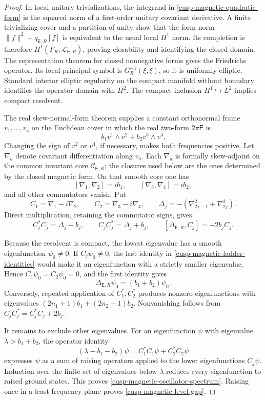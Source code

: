 \begin{proof}
In local unitary trivializations, the integrand in
\eqref{cusp-magnetic-quadratic-form} is the squared norm of a first-order
unitary covariant derivative.  A finite trivializing cover and a partition
of unity show that the form norm
\(\lVert f\rVert^2+q_{\mathsf E,R}[f]\) is equivalent to the usual local \(H^1\)
norm.  Its completion is therefore
\(H^1(F_R;\mathscr L_{\mathsf E,R})\), proving closability and identifying
the closed domain.  The representation theorem for closed nonnegative
forms gives the Friedrichs operator.  Its local principal symbol is
\(G_R^{-1}(\xi,\xi)\), so it is uniformly elliptic.  Standard interior
elliptic regularity on the compact manifold without boundary identifies
the operator domain with \(H^2\).  The compact inclusion
\(H^1\hookrightarrow L^2\) implies compact resolvent.

The real skew-normal-form theorem supplies a constant orthonormal frame
\(v_1,\ldots,v_4\) on the Euclidean cover in which the real two-form
\(2\pi\mathsf E\) is
\[
 b_1v^1\wedge v^2+b_2v^3\wedge v^4.
\]
Changing the sign of \(v^2\) or \(v^4\), if necessary, makes both
frequencies positive.  Let \(\nabla_a\) denote covariant differentiation
along \(v_a\).  Each \(\nabla_a\) is formally skew-adjoint on the common
invariant core \(\mathcal C_{\mathsf E,R}\); the closures used below are the
ones determined by the closed magnetic form.  On that smooth core one has
\[
 [\nabla_1,\nabla_2]=ib_1,
 \qquad
 [\nabla_3,\nabla_4]=ib_2,
\]
and all other commutators vanish.  Put
\[
 C_1=\nabla_1-i\nabla_2,
 \qquad
 C_2=\nabla_3-i\nabla_4,
 \qquad
 \Delta_j=-(\nabla_{2j-1}^2+\nabla_{2j}^2).
\]
Direct multiplication, retaining the commutator signs, gives
\begin{equation}
 C_j^*C_j=\Delta_j-b_j,
 \qquad
 C_jC_j^*=\Delta_j+b_j,
 \qquad
 [\Delta_{\mathsf E,R},C_j]=-2b_jC_j.
 \label{cusp-magnetic-ladder-identities}
\end{equation}

Because the resolvent is compact, the lowest eigenvalue has a smooth
eigenfunction \(\psi_0\neq0\).  If \(C_j\psi_0\neq0\), the last identity
in \eqref{cusp-magnetic-ladder-identities} would make it an eigenfunction
with a strictly smaller eigenvalue.  Hence \(C_1\psi_0=C_2\psi_0=0\), and
the first identity gives
\[
 \Delta_{\mathsf E,R}\psi_0=(b_1+b_2)\psi_0.
\]
Conversely, repeated application of \(C_1^*,C_2^*\) produces nonzero
eigenfunctions with eigenvalues
\((2n_1+1)b_1+(2n_2+1)b_2\).  Nonvanishing follows from
\(C_jC_j^*=C_j^*C_j+2b_j\).

It remains to exclude other eigenvalues.  For an eigenfunction \(\psi\)
with eigenvalue \(\lambda>b_1+b_2\), the operator identity
\[
 (\lambda-b_1-b_2)\psi
 =C_1^*C_1\psi+C_2^*C_2\psi
\]
expresses \(\psi\) as a sum of raising operators applied to the lower
eigenfunctions \(C_j\psi\).  Induction over the finite set of eigenvalues
below \(\lambda\) reduces every eigenfunction to raised ground states.
This proves \eqref{cusp-magnetic-oscillator-spectrum}.  Raising once in a
least-frequency plane proves \eqref{cusp-magnetic-level-gap}.
\end{proof}

